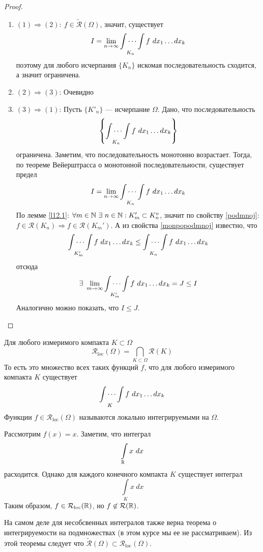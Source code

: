 \begin{proof}\tab
    \begin{enumerate}
        \item $(1)\Rightarrow(2):\ f\in \widetilde{\mathcal{R}}(\Omega)$, значит, существует
        \[I=\lim\limits_{n\to\infty}\idotsint\limits_{K_n}f\ dx_1 \dots dx_k\]
        поэтому для любого исчерпания $\{K_n\}$ искомая последовательность сходится, а значит ограничена.
        \item $(2)\Rightarrow(3)$: Очевидно
        \item $(3)\Rightarrow(1)$: Пусть $\{K'_n\}$ --- исчерпание $\Omega$. Дано, что последовательность
        \[\left\{\idotsint\limits_{K_n}f\ dx_1 \dots dx_k\right\}\]
        ограничена. Заметим, что последовательность монотонно возрастает. Тогда, по теореме Вейерштрасса о монотонной последовательности, существует предел
        \[I=\lim\limits_{n\to\infty}\idotsint\limits_{K_n}f\ dx_1\dots dx_k\]
        По лемме \ref{l12.1}: $\forall m\in \mathbb{N}\ \exists\ n\in \mathbb{N}: K_m'\subset K_n^o$, значит по свойству \ref{podmnoj}: $f\in \mathcal{R}(K_n)\Rightarrow f\in \mathcal{R}(K_m')$. А из свойства \ref{monpopodmnoj} известно, что
        \[\idotsint\limits_{K'_m}f\ dx_1\dots dx_k\leq \idotsint\limits_{K_n}f\ dx_1\dots dx_k\]
        отсюда
        \[\exists\ \lim\limits_{m\to\infty}\idotsint\limits_{K_m'}f\ dx_1 \dots dx_k=J\leq I\]
        Аналогично можно показать, что $I\leq J$.
    \end{enumerate}
\end{proof}
\begin{definition}
Для любого измеримого компакта $K\subset \Omega$
\[\mathcal{R}_{\text{loc}}(\Omega)=\bigcap\limits_{K\subset \Omega} \mathcal{R}(K)\]
То есть это множество всех таких функций $f$, что для любого измеримого компакта $K$ существует
\[\idotsint\limits_{K}f\ dx_1 \dots dx_k\]
Функции $f\in \mathcal{R}_{\text{loc}}(\Omega)$ называются локально интегрируемыми на $\Omega$.
\end{definition}
\begin{example}
    Рассмотрим $f(x)=x$. Заметим, что интеграл
    \[\int\limits_{\R}x\ dx\]
    расходится. Однако для каждого конечного компакта $K$ существует интеграл
    \[\int\limits_{K} x\ dx\]
    Таким образом, $f\in \mathcal{R}_{\text{loc}}(\mathbb{R})$, но $f\not\in \mathcal{R}(\mathbb{R})$.
\end{example}
\begin{comm}
    На самом деле для несобсвенных интегралов также верна теорема о интегрируемости на подмножествах (в этом курсе мы ее не рассматриваем). Из этой теоремы следует что $\widetilde{\mathcal{R}}(\Omega)\subset \mathcal{R}_{\text{loc}}(\Omega)$.
\end{comm}
